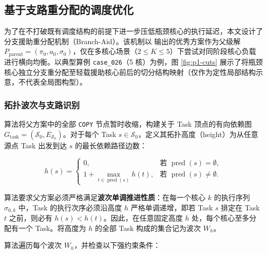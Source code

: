\documentclass[anonymous,withtoc]{gmcm2026}
\begin{document}
\subsection{基于支路重分配的调度优化}

为了在不打破既有调度结构的前提下进一步压低瓶颈核心的执行延迟，本文设计了分支援助重分配机制（Branch-Aid）。该机制以 \texttt{} 输出的优秀方案作为父级解 \(P_{\mathrm{parent}} = (\pi_0, a_0, \sigma_0)\)，仅在多核心场景（\(2 \le K \le 5\)）下尝试对同阶段核心负载进行横向均衡。以典型算例 \texttt{case\_026}（5 核）为例，图 \ref{fig:p1-cuts} 展示了将瓶颈核心独立分支重分配至轻载援助核心前后的切分结构映射（仅作为定性局部结构示意，不代表全局图构型）。

\subsubsection{拓扑波次与支路识别}

算法将父方案中的全部 \texttt{COPY} 节点暂时收缩，构建关于 Task 顶点的有向依赖图 \(G_{\mathrm{task}} = (\mathcal{S}_0, E_{\mathcal{S}_0})\)。对于每个 Task \(s \in \mathcal{S}_0\)，定义其拓扑高度（height）为从任意源点 Task 出发到达 \(s\) 的最长依赖路径边数：

\begin{equation}
h(s) = \begin{cases} 0, & \text{若 } \operatorname{pred}(s) = \emptyset, \\ 1 + \max_{t \in \operatorname{pred}(s)} h(t), & \text{若 } \operatorname{pred}(s) \ne \emptyset. \end{cases}
\end{equation}

算法要求父方案必须严格满足\textbf{波次单调推进性质}：在每一个核心 \(k\) 的执行序列 \(\sigma_{0,k}\) 中，Task 的执行次序必须沿高度 \(h\) 严格单调递增，即若 Task \(s\) 排定在 Task \(t\) 之前，则必有 \(h(s) < h(t)\)。因此，在任意固定高度 \(h\) 处，每个核心至多分配有一个 Task。将高度为 \(h\) 的全部 Task 构成的集合记为波次 \(W_h\)。

算法遍历每个波次 \(W_h\)，并检查以下强约束条件：
\end{document}
